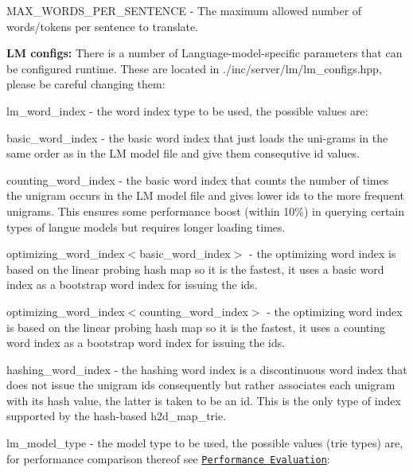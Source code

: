 \begin{DoxyItemize}
\item {\ttfamily M\+A\+X\+\_\+\+W\+O\+R\+D\+S\+\_\+\+P\+E\+R\+\_\+\+S\+E\+N\+T\+E\+N\+C\+E} -\/ The maximum allowed number of words/tokens per sentence to translate.
\end{DoxyItemize}

{\bfseries L\+M configs\+:} There is a number of Language-\/model-\/specific parameters that can be configured runtime. These are located in {\ttfamily ./inc/server/lm/lm\+\_\+configs.hpp}, please be careful changing them\+:


\begin{DoxyItemize}
\item {\ttfamily lm\+\_\+word\+\_\+index} -\/ the word index type to be used, the possible values are\+:
\begin{DoxyItemize}
\item {\ttfamily basic\+\_\+word\+\_\+index} -\/ the basic word index that just loads the uni-\/grams in the same order as in the L\+M model file and give them consequtive id values.
\item {\ttfamily counting\+\_\+word\+\_\+index} -\/ the basic word index that counts the number of times the unigram occurs in the L\+M model file and gives lower ids to the more frequent unigrams. This ensures some performance boost (within 10\%) in querying certain types of langue models but requires longer loading times.
\item {\ttfamily optimizing\+\_\+word\+\_\+index$<$basic\+\_\+word\+\_\+index$>$} -\/ the optimizing word index is based on the linear probing hash map so it is the fastest, it uses a basic word index as a bootstrap word index for issuing the ids.
\item {\ttfamily optimizing\+\_\+word\+\_\+index$<$counting\+\_\+word\+\_\+index$>$} -\/ the optimizing word index is based on the linear probing hash map so it is the fastest, it uses a counting word index as a bootstrap word index for issuing the ids.
\item {\ttfamily hashing\+\_\+word\+\_\+index} -\/ the hashing word index is a discontinuous word index that does not issue the unigram ids consequently but rather associates each unigram with its hash value, the latter is taken to be an id. This is the only type of index supported by the hash-\/based {\ttfamily h2d\+\_\+map\+\_\+trie}.
\end{DoxyItemize}
\item {\ttfamily lm\+\_\+model\+\_\+type} -\/ the model type to be used, the possible values (trie types) are, for performance comparison thereof see \href{#performance-evaluation}{\tt Performance Evaluation}\+:

\end{DoxyItemize}
